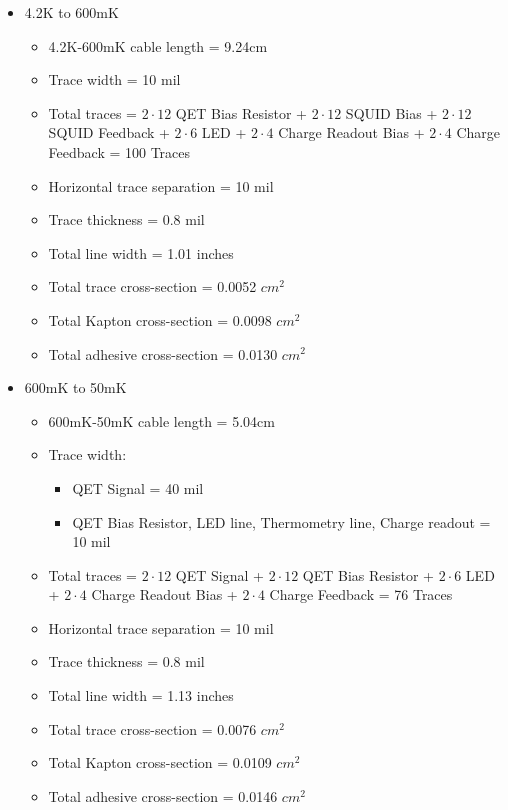 \documentclass{article}
\begin{document}
\begin{itemize}
\item 4.2K to 600mK
    \begin{itemize}
    \item 4.2K-600mK cable length = 9.24cm
    \item Trace width = 10 mil
    \item Total traces = $2\cdot12$ QET Bias Resistor + $2\cdot12$ SQUID Bias + $2\cdot12$ SQUID Feedback + $2\cdot6$ LED + $2\cdot4$ Charge Readout Bias + $2\cdot4$ Charge Feedback = 100 Traces
    \item Horizontal trace separation = 10 mil
    \item Trace thickness = 0.8 mil
    \item Total line width = 1.01 inches
    \item Total trace cross-section = 0.0052 $cm^2$
    \item Total Kapton cross-section = 0.0098 $cm^2$
    \item Total adhesive cross-section = 0.0130 $cm^2$
    \end{itemize}
\item 600mK to 50mK
    \begin{itemize}
    \item 600mK-50mK cable length = 5.04cm
    \item Trace width:
        \begin{itemize}
        \item QET Signal = 40 mil
        \item QET Bias Resistor, LED line, Thermometry line, Charge readout = 10 mil
        \end{itemize}
    \item Total traces = $2\cdot12$ QET Signal + $2\cdot12$ QET Bias Resistor + $2\cdot6$ LED + $2\cdot4$ Charge Readout Bias + $2\cdot4$ Charge Feedback = 76 Traces
    \item Horizontal trace separation = 10 mil
    \item Trace thickness = 0.8 mil
    \item Total line width = 1.13 inches
    \item Total trace cross-section = 0.0076 $cm^2$
    \item Total Kapton cross-section = 0.0109 $cm^2$
    \item Total adhesive cross-section = 0.0146 $cm^2$
    \end{itemize}
\end{itemize}
\end{document}
